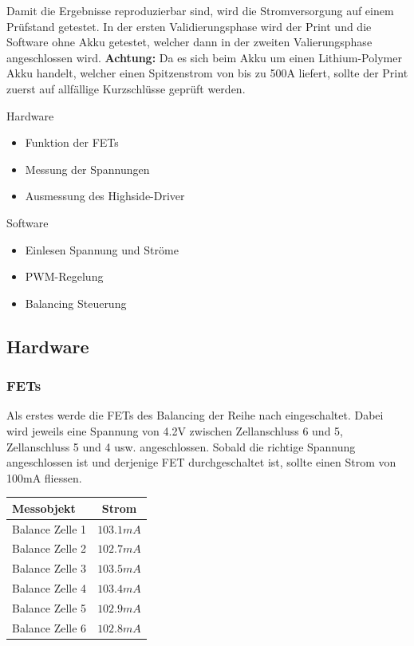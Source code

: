 Damit die Ergebnisse reproduzierbar sind, wird die Stromversorgung auf einem Prüfstand getestet. In der ersten Validierungsphase wird der Print und die Software ohne Akku getestet, welcher dann in der zweiten Valierungsphase angeschlossen wird. \textbf{Achtung:} Da es sich beim Akku um einen Lithium-Polymer Akku handelt, welcher einen Spitzenstrom von bis zu 500A liefert, sollte der Print zuerst auf allfällige Kurzschlüsse geprüft werden.   

Hardware
\begin{itemize}
	\item Funktion der FETs
	\item Messung der Spannungen
	\item Ausmessung des Highside-Driver
\end{itemize}
Software
\begin{itemize}
	\item Einlesen Spannung und Ströme
	\item PWM-Regelung
	\item Balancing Steuerung
\end{itemize}

\subsection{Hardware}
\subsubsection*{FETs}
Als erstes werde die FETs des Balancing der Reihe nach eingeschaltet. Dabei wird jeweils eine Spannung von 4.2V zwischen Zellanschluss 6 und 5, Zellanschluss 5 und 4 usw. angeschlossen. Sobald die richtige Spannung angeschlossen ist und derjenige FET durchgeschaltet ist, sollte einen Strom von 100mA fliessen. 

\begin{center}
	\begin{tabular}{l|c}
		Messobjekt & Strom \\ \hline
		Balance Zelle 1 & $103.1mA$ \\ \hline
		Balance Zelle 2 & $102.7mA$ \\ \hline
		Balance Zelle 3 & $103.5mA$ \\ \hline
		Balance Zelle 4 & $103.4mA$ \\ \hline
		Balance Zelle 5 & $102.9mA$ \\ \hline
		Balance Zelle 6 & $102.8mA$ \\ \hline
	\end{tabular} 
	\label{tab:StromBalancing}
\end{center}

